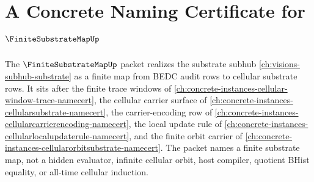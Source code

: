 \chapter{A Concrete Naming Certificate for $\FiniteSubstrateMapUp$}
\label{ch:concrete-instances-finite-substrate-map-namecert}

The $\FiniteSubstrateMapUp$ packet realizes the substrate subhub
\autoref{ch:visions-subhub-substrate} as a finite map from BEDC audit rows to
cellular substrate rows. It sits after the finite trace windows of
\autoref{ch:concrete-instances-cellular-window-trace-namecert}, the cellular
carrier surface of \autoref{ch:concrete-instances-cellularsubstrate-namecert},
the carrier-encoding row of
\autoref{ch:concrete-instances-cellularcarrierencoding-namecert}, the local
update rule of \autoref{ch:concrete-instances-cellularlocalupdaterule-namecert},
and the finite orbit carrier of
\autoref{ch:concrete-instances-cellularorbitsubstrate-namecert}. The packet
names a finite substrate map, not a hidden evaluator, infinite cellular orbit,
host compiler, quotient BHist equality, or all-time cellular induction.

